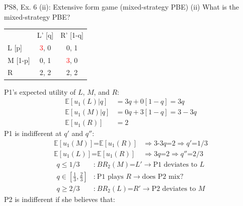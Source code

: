 \begin{frame}{PS8, Ex. 6 (ii): Extensive form game (mixed-strategy PBE)}
    (ii) What is the mixed-strategy PBE? \vspace{-10pt}
    \begin{multicols}{2}
      \begin{table}
        \begin{tabular}{l|c|c|}
          \multicolumn{1}{c}{} & \multicolumn{1}{c}{L' [q]} & \multicolumn{1}{c}{R' [1-q]} \\\cline{2-3}
          L [p]   & \textcolor{red}{3}, 0 & 0, \color{blue}1 \\\cline{2-3}
          M [1-p] & 0, \color{blue}1 & \textcolor{red}{3}, 0 \\\cline{2-3}
          R       & 2, \color{blue}2 & 2, \color{blue}2 \\\cline{2-3}
        \end{tabular}
      \end{table} \vspace{-6pt}
      P1's expected utility of $L$, $M$, and $R$: \vspace{-8pt}
      \begin{align*}
        \mathbb{E}[u_1(L)|q]&=3q+0[1-q]=3q\\
        \mathbb{E}[u_1(M)|q]&=0q+3[1-q]=3-3q\\
        \mathbb{E}[u_1(R)]&=2
      \end{align*}
      P1 is indifferent at $q'$ and $q''$: \vspace{-8pt}
      \begin{align*}
        \mathbb{E}[u_1(M)]\text{=}\mathbb{E}[u_1(R)]&\Rightarrow \text{3-3}q\text{=}2\Rightarrow q'\text{=}1/3\\
        \mathbb{E}[u_1(L)]\text{=}\mathbb{E}[u_1(R)]&\Rightarrow 3q\text{=}2\Rightarrow q''\text{=}2/3
      \end{align*} \vspace{-22pt}
      \begin{align*}
        q\leq1/3&\text{:}\ BR_2(M)\text{=}L'\rightarrow\text{P1 deviates to }L\\
        q\text{$\in$}{\textstyle\left[\frac{1}{3},\frac{2}{3}\right]}&\text{:}\ \text{P1 plays }R\rightarrow\text{does P2 mix?}\\
        q\geq2/3&\text{:}\ BR_2(L)\text{=}R'\rightarrow\text{P2 deviates to }M
      \end{align*}
      P2 is indifferent if she believes that: \vspace{-8pt}

\end{multicols}
\end{frame}

